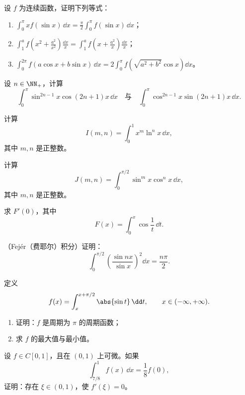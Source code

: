 \begin{xexercise}[5]
设 $f$ 为连续函数，证明下列等式：
\begin{enumerate}[label=(\arabic*)]
  \item $\displaystyle\int_0^\pi x f(\sin x)\,\dd x=\frac\pi2\int_0^\pi f(\sin x)\,\dd x$；
  \item $\displaystyle\int_1^a f\left(x^2+\frac{a^2}{x^2}\right)\frac{\dd x}{x}=\int_1^a f\left(x+\frac{a^2}{x}\right)\frac{\dd x}{x}$；
  \item $\displaystyle\int_0^{2\pi}f(a\cos x+b\sin x)\,\dd x=2\int_0^\pi f\left(\sqrt{a^2+b^2}\cos x\right)\dd x$。
\end{enumerate}
\end{xexercise}

\begin{xexercise}[6]
设 $n\in\NN_+$，计算
\[
  \int_0^\pi\sin^{2n-1}x\cos(2n+1)x\,\dd x
  \quad\text{与}\quad
  \int_0^\pi\cos^{2n-1}x\sin(2n+1)x\,\dd x.
\]
\end{xexercise}

\begin{xexercise}[7]
计算
\[
  I(m,n)=\int_0^1x^m\ln^n x\,\dd x,
\]
其中 $m,n$ 是正整数。
\end{xexercise}

\begin{xexercise}[8]
计算
\[
  J(m,n)=\int_0^{\pi/2}\sin^m x\cos^n x\,\dd x,
\]
其中 $m,n$ 是正整数。
\end{xexercise}

\begin{xexercise}[9]
求 $F'(0)$，其中
\[
  F(x)=\int_0^x\cos\frac1t\,\dd t.
\]
\end{xexercise}

\begin{xexercise}[10]
（Fejér（费耶尔）积分）证明：
\[
  \int_0^{\pi/2}\left(\frac{\sin nx}{\sin x}\right)^2\dd x=\frac{n\pi}{2}.
\]
\end{xexercise}

\begin{xexercise}[11]
定义
\[
  f(x)=\int_x^{x+\pi/2}\abs{\sin t}\,\dd t,
  \qquad x\in(-\infty,+\infty).
\]
\begin{enumerate}[label=(\arabic*)]
  \item 证明：$f$ 是周期为 $\pi$ 的周期函数；
  \item 求 $f$ 的最大值与最小值。
\end{enumerate}
\end{xexercise}

\begin{xexercise}[12]
设 $f\in C[0,1]$，且在 $(0,1)$ 上可微。如果
\[
  \int_{7/8}^1 f(x)\,\dd x=\frac18f(0),
\]
证明：存在 $\xi\in(0,1)$，使 $f'(\xi)=0$。
\end{xexercise}



